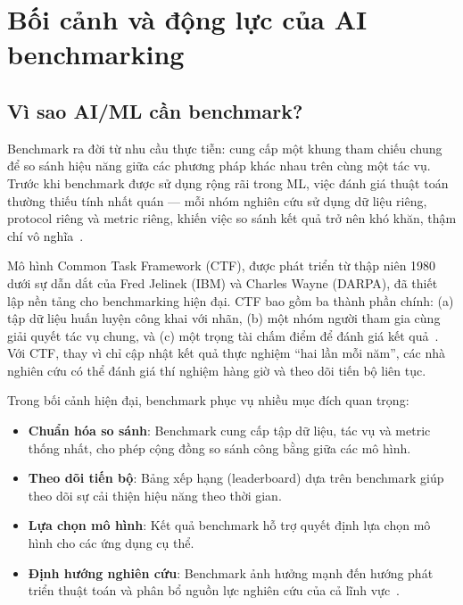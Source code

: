 
\section{Bối cảnh và động lực của AI benchmarking}
\label{sec:background}

\subsection{Vì sao AI/ML cần benchmark?}

Benchmark ra đời từ nhu cầu thực tiễn: cung cấp một khung tham chiếu chung để so sánh hiệu năng giữa các phương pháp khác nhau trên cùng một tác vụ. Trước khi benchmark được sử dụng rộng rãi trong ML, việc đánh giá thuật toán thường thiếu tính nhất quán --- mỗi nhóm nghiên cứu sử dụng dữ liệu riêng, protocol riêng và metric riêng, khiến việc so sánh kết quả trở nên khó khăn, thậm chí vô nghĩa~\cite{everything_benchmark}.

Mô hình Common Task Framework (CTF), được phát triển từ thập niên 1980 dưới sự dẫn dắt của Fred Jelinek (IBM) và Charles Wayne (DARPA), đã thiết lập nền tảng cho benchmarking hiện đại. CTF bao gồm ba thành phần chính: (a) tập dữ liệu huấn luyện công khai với nhãn, (b) một nhóm người tham gia cùng giải quyết tác vụ chung, và (c) một trọng tài chấm điểm để đánh giá kết quả~\cite{everything_benchmark}. Với CTF, thay vì chỉ cập nhật kết quả thực nghiệm ``hai lần mỗi năm'', các nhà nghiên cứu có thể đánh giá thí nghiệm hàng giờ và theo dõi tiến bộ liên tục.

Trong bối cảnh hiện đại, benchmark phục vụ nhiều mục đích quan trọng:

\begin{itemize}
    \item \textbf{Chuẩn hóa so sánh}: Benchmark cung cấp tập dữ liệu, tác vụ và metric thống nhất, cho phép cộng đồng so sánh công bằng giữa các mô hình.
    \item \textbf{Theo dõi tiến bộ}: Bảng xếp hạng (leaderboard) dựa trên benchmark giúp theo dõi sự cải thiện hiệu năng theo thời gian.
    \item \textbf{Lựa chọn mô hình}: Kết quả benchmark hỗ trợ quyết định lựa chọn mô hình cho các ứng dụng cụ thể.
    \item \textbf{Định hướng nghiên cứu}: Benchmark ảnh hưởng mạnh đến hướng phát triển thuật toán và phân bổ nguồn lực nghiên cứu của cả lĩnh vực~\cite{everything_benchmark}.
\end{itemize}

